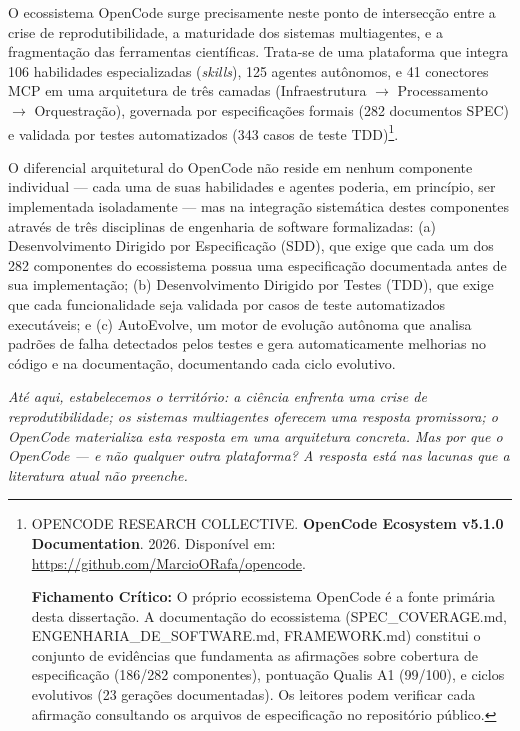 O ecossistema OpenCode surge precisamente neste ponto de intersecção entre a crise de reprodutibilidade, a maturidade dos sistemas multiagentes, e a fragmentação das ferramentas científicas. Trata-se de uma plataforma que integra 106 habilidades especializadas (\textit{skills}), 125 agentes autônomos, e 41 conectores MCP em uma arquitetura de três camadas (Infraestrutura $\rightarrow$ Processamento $\rightarrow$ Orquestração), governada por especificações formais (282 documentos SPEC) e validada por testes automatizados (343 casos de teste TDD)\footnote{
  OPENCODE RESEARCH COLLECTIVE. \textbf{OpenCode Ecosystem v5.1.0 Documentation}. 2026. Disponível em: \url{https://github.com/MarcioORafa/opencode}.

  \textbf{Fichamento Crítico:} O próprio ecossistema OpenCode é a fonte primária desta dissertação. A documentação do ecossistema (SPEC\_COVERAGE.md, ENGENHARIA\_DE\_SOFTWARE.md, FRAMEWORK.md) constitui o conjunto de evidências que fundamenta as afirmações sobre cobertura de especificação (186/282 componentes), pontuação Qualis A1 (99/100), e ciclos evolutivos (23 gerações documentadas). Os leitores podem verificar cada afirmação consultando os arquivos de especificação no repositório público.
}.

O diferencial arquitetural do OpenCode não reside em nenhum componente individual --- cada uma de suas habilidades e agentes poderia, em princípio, ser implementada isoladamente --- mas na integração sistemática destes componentes através de três disciplinas de engenharia de software formalizadas: (a) Desenvolvimento Dirigido por Especificação (SDD), que exige que cada um dos 282 componentes do ecossistema possua uma especificação documentada antes de sua implementação; (b) Desenvolvimento Dirigido por Testes (TDD), que exige que cada funcionalidade seja validada por casos de teste automatizados executáveis; e (c) AutoEvolve, um motor de evolução autônoma que analisa padrões de falha detectados pelos testes e gera automaticamente melhorias no código e na documentação, documentando cada ciclo evolutivo.

\vspace{0.3cm}
{\small\itshape Até aqui, estabelecemos o território: a ciência enfrenta uma crise de reprodutibilidade; os sistemas multiagentes oferecem uma resposta promissora; o OpenCode materializa esta resposta em uma arquitetura concreta. Mas por que o OpenCode --- e não qualquer outra plataforma? A resposta está nas lacunas que a literatura atual não preenche.}

